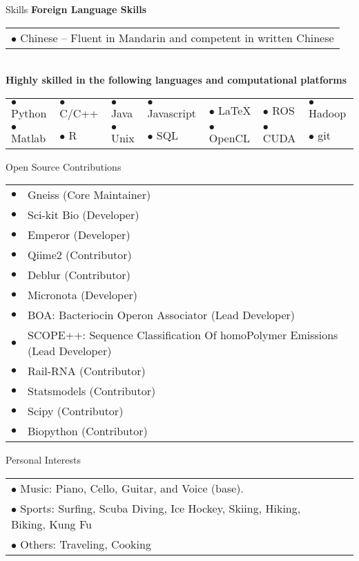 \documentclass{resume} %
\begin{document}
\begin{rSection}{Skills}
  \textbf{Foreign Language Skills}\\
  \begin{tabular}{l}
    $\bullet$ Chinese --  Fluent in Mandarin and competent in written Chinese\\
  \end{tabular}\\
  \textbf{Highly skilled in the following languages and computational platforms}\\
  \begin{tabular}{lllllll}
     $\bullet$ Python   &  $\bullet$ C/C++ &  $\bullet$ Java  & $\bullet$ Javascript &  $\bullet$ \LaTeX   &  $\bullet$ ROS    &  $\bullet$ Hadoop\\
     $\bullet$ Matlab   &  $\bullet$ R     &  $\bullet$ Unix   & $\bullet$ SQL      &  $\bullet$ OpenCL   &  $\bullet$ CUDA   &   $\bullet$ git\\
  \end{tabular}
\end{rSection}
\begin{rSection}{Open Source Contributions}
  \begin{tabular}{ll}
      $\bullet$ & Gneiss (Core Maintainer)\\
      $\bullet$ & Sci-kit Bio (Developer)\\
      $\bullet$ & Emperor (Developer)\\
      $\bullet$ & Qiime2 (Contributor)\\
      $\bullet$ & Deblur (Contributor)\\
      $\bullet$ & Micronota (Developer)\\
      $\bullet$ & BOA: Bacteriocin Operon Associator (Lead Developer)\\
      $\bullet$ & SCOPE++: Sequence Classification Of homoPolymer Emissions (Lead Developer)\\
      $\bullet$ & Rail-RNA (Contributor)\\
      $\bullet$ & Statsmodels (Contributor)\\
      $\bullet$ & Scipy (Contributor)\\
      $\bullet$ & Biopython (Contributor)\\
  \end{tabular}
\end{rSection}

\begin{rSection}{Personal Interests}
  \begin{tabular}{ll}
      $\bullet$ Music: Piano, Cello, Guitar, and Voice (base).\\
      $\bullet$ Sports: Surfing, Scuba Diving, Ice Hockey, Skiing, Hiking, Biking, Kung Fu \\
      $\bullet$ Others: Traveling, Cooking\\
  \end{tabular}
\end{rSection}

\end{document}
